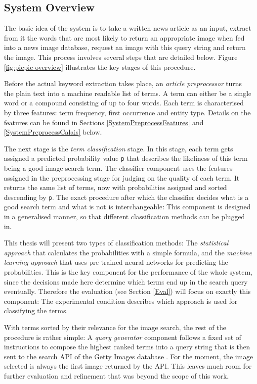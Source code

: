 \documentclass[11pt,a4paper,twoside]{article}
\begin{document}
\subsection{System Overview} \label{SystemOverview}

The basic idea of the system is to take a written news article as an input, extract from it the words that are most likely to return an appropriate image when fed into a news image database, request an image with this query string and return the image. This process involves several steps that are detailed below. Figure \ref{fig:picpic-overview} illustrates the key stages of this procedure.

Before the actual keyword extraction takes place, an \emph{article preprocessor} turns the plain text into a machine readable list of terms. A term can either be a single word or a compound consisting of up to four words. Each term is characterised by three features: term frequency, first occurrence and entity type. Details on the features can be found in Sections \ref{SystemPreprocessFeatures} and \ref{SystemPreprocessCalais} below.

The next stage is the \emph{term classification} stage. In this stage, each term gets assigned a predicted probability value \lstinline|p| that describes the likeliness of this term being a good image search term. The classifier component uses the features assigned in the preprocessing stage for judging on the quality of each term. It returns the same list of terms, now with probabilities assigned and sorted descending by \lstinline{p}. The exact procedure after which the classifier decides what is a good search term and what is not is interchangeable: This component is designed in a generalised manner, so that different classification methods can be plugged in.

This thesis will present two types of classification methods: The \emph{statistical approach} that calculates the probabilities with a simple formula, and the \emph{machine learning approach} that uses pre-trained neural networks for predicting the probabilities. This is the key component for the performance of the whole system, since the decisions made here determine which terms end up in the search query eventually. Therefore the evaluation (see Section \ref{Eval}) will focus on exactly this component: The experimental condition describes which approach is used for classifying the terms.

With terms sorted by their relevance for the image search, the rest of the procedure is rather simple: A \emph{query generator} component follows a fixed set of instructions to compose the highest ranked terms into a query string that is then sent to the search API of the Getty Images database \cite{GettyImagesAPIOverview}. For the moment, the image selected is always the first image returned by the API. This leaves much room for further evaluation and refinement that was beyond the scope of this work.
\end{document}
